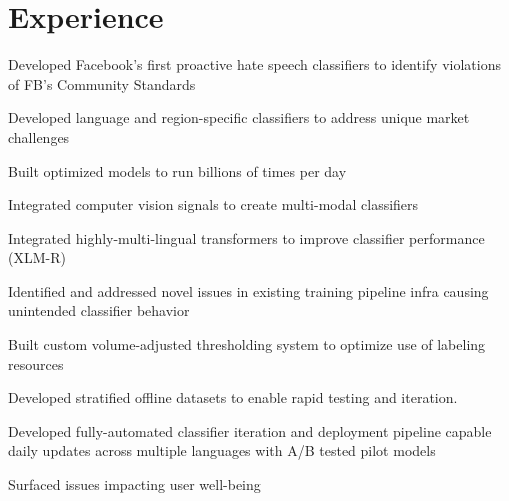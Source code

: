 \documentclass[]{resume}
\begin{document}
\begin{minipage}[t]{0.64\textwidth}



\section{Experience}



\sectionsep

\vspace{\topsep} %
\begin{tightemize}
\item Developed Facebook's first proactive hate speech classifiers to identify violations of
FB's Community Standards
\item Developed language and region-specific classifiers to address unique market challenges
\item Built optimized models to run billions of times per day
\item Integrated computer vision signals to create multi-modal classifiers
\item Integrated highly-multi-lingual transformers to improve classifier performance (XLM-R)
\item Identified and addressed novel issues in existing training pipeline infra causing unintended classifier behavior
\item Built custom volume-adjusted thresholding system to optimize use of labeling resources
\item Developed stratified offline datasets to enable rapid testing and iteration.
\item Developed fully-automated classifier iteration and deployment pipeline capable daily updates 
across multiple languages with A/B tested pilot models
\item Surfaced issues impacting user well-being
\end{tightemize}

\sectionsep


\end{minipage}
\end{document}
